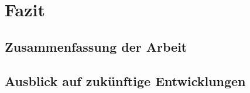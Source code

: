 

\chapter{Fazit}
\label{chap:fazit}


\section{Zusammenfassung der Arbeit}
\section{Ausblick auf zukünftige Entwicklungen}